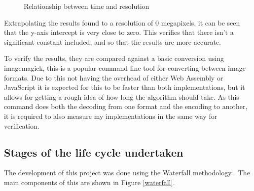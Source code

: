 \documentclass[12pt,a4paper]{article}
\begin{document}
\begin{figure}[H]
    \centering
    \caption{Relationship between time and resolution}

\end{figure}

Extrapolating the results found to a resolution of 0 megapixels, it can be seen that the y-axis intercept is very close to zero. This verifies that there isn't a significant constant included, and so that the results are more accurate.


To verify the results, they are compared against a basic conversion using imagemagick, this is a popular command line tool for converting between image formats. Due to this not having the overhead of either Web Assembly or JavaScript it is expected for this to be faster than both implementations, but it allows for getting a rough idea of how long the algorithm should take. As this command does both the decoding from one format and the encoding to another, it is required to also measure my implementations in the same way for verification.

\subsection{Stages of the life cycle undertaken}

The development of this project was done using the Waterfall methodology \cite{royce1987managing}. The main components of this are shown in Figure \ref{waterfall}.
\end{document}
